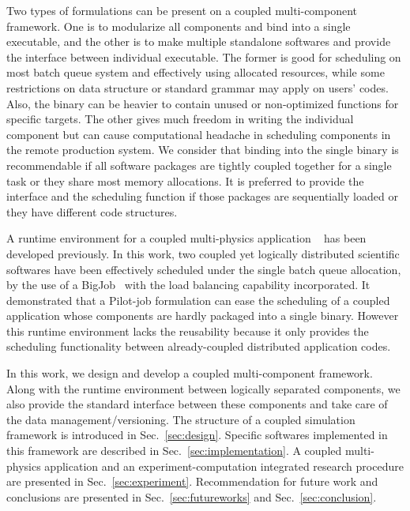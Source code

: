 \documentclass[10pt,conference]{IEEEtran}
\begin{document}
Two types of formulations can be present on a coupled multi-component 
framework. One is to modularize all components and bind into
a single executable, and the other is to make multiple standalone softwares
and provide the interface between individual executable. 
The former is good for scheduling on most batch queue system and 
effectively using allocated resources, while some restrictions 
on data structure or standard grammar may apply on users' codes.
Also, the binary can be heavier to contain unused or non-optimized functions
for specific targets. The other gives much freedom in writing 
the individual component but can cause computational headache in scheduling
components in the remote production system.
We consider that binding into the single binary is recommendable if
all software packages are tightly coupled together for a single task or
they share most memory allocations. It is preferred to provide
the interface and the scheduling function if those packages are
sequentially loaded or they have different code structures.

A runtime environment for a coupled multi-physics application
~\cite{CCGrid_Hybrid} has been developed previously. In this work,
two coupled yet logically distributed scientific softwares have been
effectively scheduled under the single batch queue allocation, 
by the use of a BigJob~\cite{saga_royalsoc} with the load balancing
capability incorporated. It demonstrated that a Pilot-job formulation
can ease the scheduling of a coupled application whose components are
hardly packaged into a single binary. However this runtime environment
lacks the reusability because it only provides the scheduling functionality
between already-coupled distributed application codes.

In this work, we design and develop a coupled multi-component framework.
Along with the runtime environment between logically separated components,
we also provide the standard interface between these components and
take care of the data management/versioning. The structure of
a coupled simulation framework is introduced in Sec.~\ref{sec:design}.
Specific softwares implemented in this framework are described in
Sec.~\ref{sec:implementation}. A coupled multi-physics application and
an experiment-computation integrated research procedure are presented
in Sec.~\ref{sec:experiment}. Recommendation for future work and 
conclusions are presented in Sec.~\ref{sec:futureworks} and
Sec.~\ref{sec:conclusion}.
\end{document}
